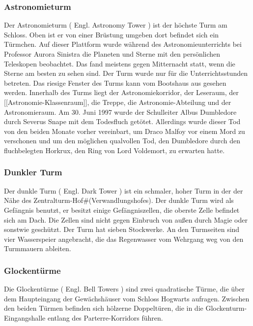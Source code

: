 \documentclass[a4paper, 10pt]{article}
\begin{document}
\subsubsection*{\large Astronomieturm}
Der Astronomieturm (  Engl.  Astronomy Tower ) ist der höchste Turm am Schloss. Oben ist er von einer Brüstung umgeben dort befindet sich ein Türmchen. Auf dieser Plattform wurde während des Astronomieunterrichts bei Professor Aurora Sinistra die Planeten und Sterne mit den persönlichen Teleskopen beobachtet. Das fand meistens gegen Mitternacht statt, wenn die Sterne am besten zu sehen sind. Der Turm wurde nur für die Unterrichtsstunden betreten. Das riesige Fenster des Turms kann vom Bootshaus aus gesehen werden.
\vspace{10pt}
\newline
Innerhalb des Turms liegt der Astronomiekorridor, der Leseraum, der [[Astronomie-Klassenraum]], die Treppe, die Astronomie-Abteilung und der Astronomieraum. Am 30. Juni 1997 wurde der Schulleiter Albus Dumbledore durch Severus Snape mit dem Todesfluch getötet. Allerdings wurde dieser Tod von den beiden Monate vorher vereinbart, um Draco Malfoy vor einem Mord zu verschonen und um den möglichen qualvollen Tod, den Dumbledore durch den fluchbelegten Horkrux, den Ring von Lord Voldemort, zu erwarten hatte.
\subsubsection*{\large Dunkler Turm}
Der dunkle Turm (  Engl.  Dark Tower ) ist ein schmaler, hoher Turm in der der Nähe des Zentralturm-Hof#(Verwandlungshofes). Der dunkle Turm wird als Gefängnis benutzt, er besitzt einige Gefängniszellen, die oberste Zelle befindet sich am Dach. Die Zellen sind nicht gegen Einbruch von außen durch Magie oder sonstwie geschützt. Der Turm hat sieben Stockwerke. An den Turmseiten sind vier Wasserspeier angebracht, die das Regenwasser vom Wehrgang weg von den Turmmauern ableiten.
\subsubsection*{\large Glockentürme}
Die Glockentürme (  Engl.  Bell Towers ) sind zwei quadratische Türme, die über dem Haupteingang der Gewächshäuser vom Schloss Hogwarts aufragen. Zwischen den beiden Türmen befinden sich hölzerne Doppeltüren, die in die Glockenturm-Eingangshalle entlang des Parterre-Korridors führen.
\end{document}
